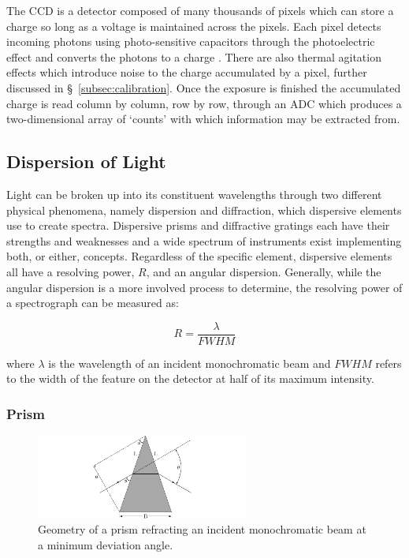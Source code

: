 The \gls{CCD} is a detector composed of many thousands of pixels which can store a charge so long as a voltage is maintained across the pixels. Each pixel detects incoming photons using photo-sensitive capacitors through the photoelectric effect and converts the photons to a charge \citep{CCDastronomy}. There are also thermal agitation effects which introduce noise to the charge accumulated by a pixel, further discussed in \S~\ref{subsec:calibration}. Once the exposure is finished the accumulated charge is read column by column, row by row, through an \gls{ADC}  which produces a two-dimensional array of `counts' with which information may be extracted from.

\subsection{Dispersion of Light} \label{subsec:dispersion}

Light can be broken up into its constituent wavelengths through two different physical phenomena, namely dispersion and diffraction, which dispersive elements use to create spectra. Dispersive prisms and diffractive gratings each have their strengths and weaknesses and a wide spectrum of instruments exist implementing both, or either, concepts. Regardless of the specific element, dispersive elements all have a resolving power, $R$, and an angular dispersion. Generally, while the angular dispersion is a more involved process to determine, the resolving power of a spectrograph can be measured as:

\begin{equation}
    R = \frac{\lambda}{FWHM}
    \label{eq:resolving_power}
\end{equation}

\noindent where $\lambda$ is the wavelength of an incident monochromatic beam and $FWHM$ refers to the width of the feature on the detector at half of its maximum intensity.

\subsubsection{Prism} \label{subsubsec:prism}

\begin{figure}[t]
    \centering
    \includegraphics[width = 7cm]{figures/2_prism_diagram.pdf}
    \caption{Geometry of a prism refracting an incident monochromatic beam at a minimum deviation angle.}
    \label{fig:prism_diagram}
\end{figure}


